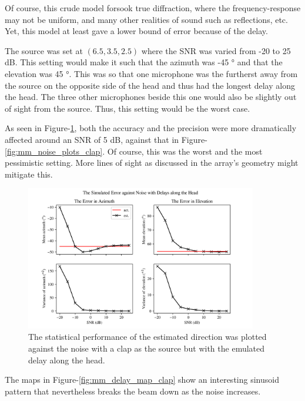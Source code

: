 \documentclass[notitlepage]{report}
\begin{document}
Of course, this crude model forsook true diffraction, where the frequency-response may not be uniform, and many other realities of sound such as reflections, etc. Yet, this model at least gave a lower bound of error because of the delay.

The source was set at $(6.5,3.5,2.5)$ where the SNR was varied from -20 to 25 \si{dB}. This setting would make it such that the azimuth was -45 \si{\degree} and that the elevation was 45 \si{\degree}. This was so that one microphone was the furtherst away from the source on the opposite side of the head and thus had the longest delay along the head. The three other microphones beside this one would also be slightly out of sight from the source. Thus, this setting would be the worst case.

As seen in Figure-\ref{fig:mm_delay_plots_clap}, both the accuracy and the precision were more dramatically affected around an SNR of 5 \si{dB}, against that in Figure-\ref{fig:mm_noise_plots_clap}. Of course, this was the worst and the most pessimistic setting. More lines of sight as discussed in the array's geometry might mitigate this.

\begin{figure}[H]
\includegraphics[width=0.9\textwidth]{../Python/main_method/delay/head/plots.png}
\centering
\caption{The statistical performance of the estimated direction was plotted against the noise with a clap as the source but with the emulated delay along the head.}
\label{fig:mm_delay_plots_clap}
\centering
\end{figure}

The maps in Figure-\ref{fig:mm_delay_map_clap} show an interesting sinusoid pattern that nevertheless breaks the beam down as the noise increases.
\end{document}
